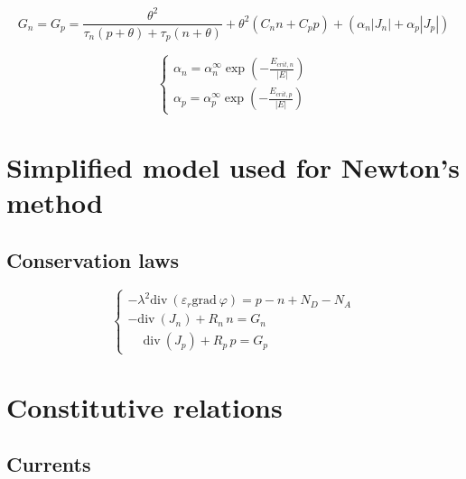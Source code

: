 \documentclass[10pt]{article}
\begin{document}
\begin{equation}\label{eq:generation}
G_{n} = G_{p} = 
\displaystyle 
\frac{\theta^{2}}{\tau_{n} (p + \theta) + \tau_{p} (n + \theta)}
+ \theta^{2} \left(C_{n} n + C_{p} p \right)
+ \left(\alpha_{n} |J_{n}|+ \alpha_{p} |J_{p}| \right)
\end{equation}


\begin{equation}\label{eq:ioniz_coeff}
\left\{
\begin{array}{ll}
\alpha_{n} = \displaystyle 
\alpha_{n}^{\infty} \exp \left( -\frac{E_{crit,n}}{|E|} \right)
\\[5mm]
\alpha_{p} = \displaystyle 
\alpha_{p}^{\infty} \exp \left( -\frac{E_{crit,p}}{|E|} \right)
\end{array}
\right.
\end{equation}

\newpage

\section{Simplified model used for Newton's method}
\subsection{Conservation laws}

\begin{equation}\label{eq:conservationN}
\left\{
\begin{array}{ll}
-\lambda^{2}\mathrm{div}\ \left(\varepsilon_{r} 
\mathrm{grad}\ \varphi \right) = p - n + N_{D} - N_{A} \\[5mm]
-\mathrm{div}\ \left(J_{n} \right) + R_{n} \, n = G_{n} \\[5mm]
\phantom{-}\mathrm{div}\ \left(J_{p} \right) + R_{p} \, p = G_{p}
\end{array}
\right.
\end{equation}

\section{Constitutive relations}

\subsection{Currents}
\end{document}
